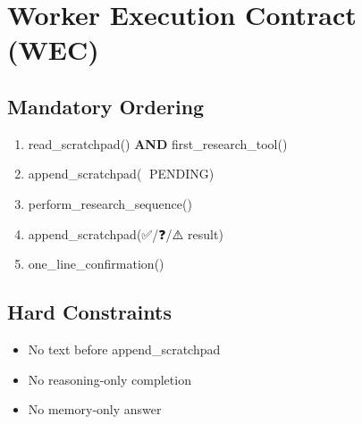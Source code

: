 \section{Worker Execution Contract (WEC)}

\subsection*{Mandatory Ordering}

\begin{enumerate}
    \item read\_scratchpad() \quad \textbf{AND} \quad first\_research\_tool()
    \item append\_scratchpad(🔄 PENDING)
    \item perform\_research\_sequence()
    \item append\_scratchpad(✅/❓/⚠️ result)
    \item one\_line\_confirmation()
\end{enumerate}

\subsection*{Hard Constraints}

\begin{itemize}
    \item No text before append\_scratchpad
    \item No reasoning-only completion
    \item No memory-only answer
\end{itemize}